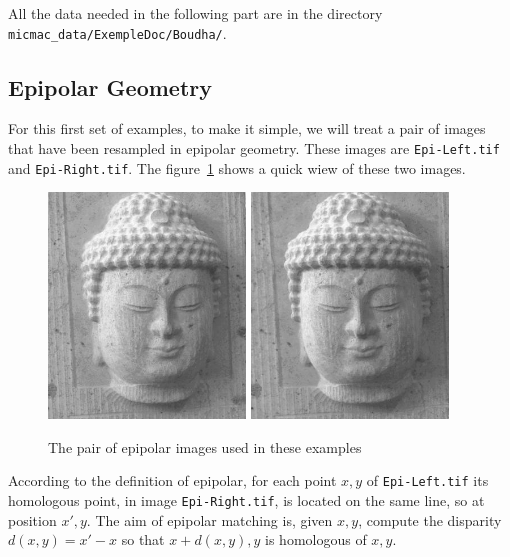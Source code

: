 All the data needed in the following part are in the directory
{\tt micmac\_data/ExempleDoc/Boudha/}.


\subsection{Epipolar Geometry}

For this first set of examples, to make it simple, we will treat
a pair of images that have been resampled in epipolar geometry.
These images are {\tt Epi-Left.tif} and {\tt Epi-Right.tif}.
The figure~\ref{FIG:EPIP} shows a quick wiew of these two images.


\begin{figure}
\hspace{10 mm}
\includegraphics[height=60mm]{FIGS/Boudhas/Epi-Left.jpg}
\hspace{10 mm}
\includegraphics[height=60mm]{FIGS/Boudhas/Epi-Right.jpg}
\caption{The pair of epipolar images used in these examples}
\label{FIG:EPIP}
\end{figure}


According to the definition of epipolar, for each point $x,y$ of {\tt Epi-Left.tif} its
homologous point, in  image {\tt Epi-Right.tif}, is located on the same line, so at
position $x',y$.  The aim of epipolar matching is, given $x,y$,  compute the
disparity $d(x,y)=x'-x$ so that $x+d(x,y),y$ is homologous of  $x,y$.

